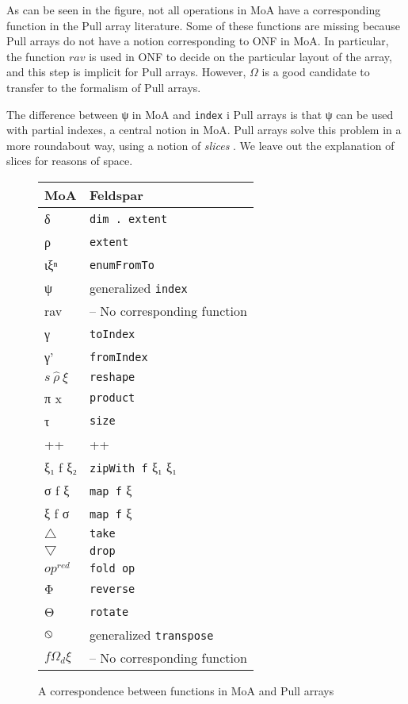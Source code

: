 \documentclass[preprint]{sigplanconf}
\begin{document}
As can be seen in the figure, not all operations in MoA have a
corresponding function in the Pull array literature. Some of these
functions are missing because Pull arrays do not have a notion
corresponding to ONF in MoA. In particular, the function $rav$ is used
in ONF to decide on the particular layout of the array, and this step
is implicit for Pull arrays. However, $\Omega$ is a good candidate to
transfer to the formalism of Pull arrays.

The difference between ψ in MoA and \verb!index! i Pull arrays is that
ψ can be used with partial indexes, a central notion in MoA. Pull
arrays solve this problem in a more roundabout way, using a notion of
\emph{slices} \cite{keller2010regular}. We leave out the explanation
of slices for reasons of space.

\begin{figure}
\begin{center}
\begin{tabular}{|@{}l|l@{}|}
\hline
MoA & Feldspar
\\
\hline
δ & \verb!dim . extent!
\\
ρ & \verb!extent!
\\
ιξⁿ & \verb!enumFromTo!
\\
ψ & generalized \verb!index!
\\
rav & -- No corresponding function
\\
γ & \verb!toIndex!
\\
γ' & \verb!fromIndex!
\\
$s \: \hat{ρ} \: ξ$ & \verb!reshape!
\\
π x & \verb!product!
\\
τ & \verb!size!
\\
++ & ++
\\
ξ₁ f ξ₂ & \verb!zipWith f! ξ₁ ξ₁
\\
σ f ξ & \verb!map f! ξ
\\
ξ f σ & \verb!map f! ξ
\\
$\bigtriangleup$ & \verb!take!
\\
$\bigtriangledown$ & \verb!drop!
\\
$op^{red}$ & \verb!fold op!
\\
Φ & \verb!reverse!
\\
Θ & \verb!rotate!
\\
$\varobslash$ & generalized \verb!transpose!
\\
$f Ω_d ξ$ & -- No corresponding function
\\
\hline
\end{tabular}
\end{center}
\caption{A correspondence between functions in MoA and Pull arrays}
\label{fig:rosetta}
\end{figure}
\end{document}
